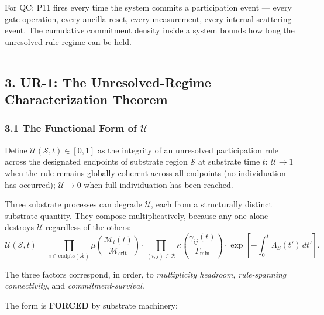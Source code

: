 \documentclass[
  11pt,
  a4paper,
]{article}
\begin{document}
For QC: P11 fires every time the system commits a participation event
--- every gate operation, every ancilla reset, every measurement, every
internal scattering event. The cumulative commitment density inside a
system bounds how long the unresolved-rule regime can be held.

\begin{center}\rule{0.5\linewidth}{0.5pt}\end{center}

\subsection{3. UR-1: The Unresolved-Regime Characterization
Theorem}\label{ur-1-the-unresolved-regime-characterization-theorem}

\subsubsection{\texorpdfstring{3.1 The Functional Form of
\(\mathcal{U}\)}{3.1 The Functional Form of \textbackslash mathcal\{U\}}}\label{the-functional-form-of-mathcalu}

Define \(\mathcal{U}(\mathcal{S},t) \in [0,1]\) as the integrity of an
unresolved participation rule across the designated endpoints of
substrate region \(\mathcal{S}\) at substrate time \(t\):
\(\mathcal{U} \to 1\) when the rule remains globally coherent across all
endpoints (no individuation has occurred); \(\mathcal{U} \to 0\) when
full individuation has been reached.

Three substrate processes can degrade \(\mathcal{U}\), each from a
structurally distinct substrate quantity. They compose multiplicatively,
because any one alone destroys \(\mathcal{U}\) regardless of the others:
\[
\mathcal{U}(\mathcal{S},t) = \prod_{i \in \mathrm{endpts}(\mathcal{R})} \mu\!\left(\frac{\mathcal{M}_i(t)}{\mathcal{M}_{\mathrm{crit}}}\right) \cdot \prod_{(i,j) \in \mathcal{R}} \kappa\!\left(\frac{\gamma_{ij}(t)}{\Gamma_{\mathrm{min}}}\right) \cdot \exp\!\left[-\int_0^t \Lambda_{S}(t')\,dt'\right].
\]

The three factors correspond, in order, to \emph{multiplicity headroom},
\emph{rule-spanning connectivity}, and \emph{commitment-survival}.

The form is \textbf{FORCED} by substrate machinery:
\end{document}
